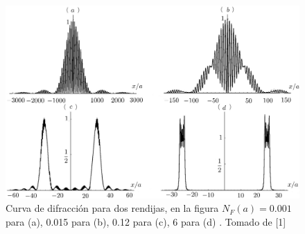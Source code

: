 \begin{figure}[h!]
\centering
\includegraphics[width=14.5cm]{Imagenes/Fig11}
\caption[Patrón de interferencia, 2 rendijas]{Curva de difracción para dos rendijas, en la figura  $N_F(a)=0.001$ para (a), 0.015 para (b), 0.12 para (c), 6 para (d) . Tomado de [1]}
\end{figure}
\newpage
\newpage





